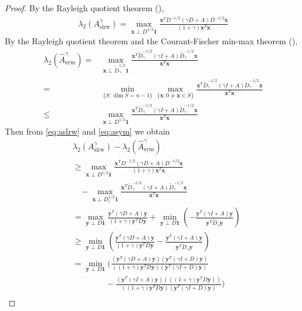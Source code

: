 \documentclass{article}
\newcommand{\x}{{\boldsymbol{x}}}
\newcommand{\0}{{\boldsymbol{0}}}
\newcommand{\6}{{\partial}}
\newcommand{\8}{{\infty}}
\newcommand{\4}{{\nabla}}
\begin{document}
\begin{proof}
By the Rayleigh quotient theorem (\citealp[Sec. 4.3]{HorJ13}),
\begin{align} \label{eq:aslrw}
\lambda_2(A_{\text{slrw}}^\gamma)
=   \max_{\bm{x}\perp D^{1/2}\bm{1}} \frac{\bm{x}^T D^{-1/2}(\gamma D + A) D^{-1/2} \bm{x}}{(1+\gamma) \bm{x}^T \bm{x}}  
\end{align}
By the Rayleigh quotient theorem and the Courant-Fischer min-max theorem (\citealp[Sec. 4.3]{HorJ13}), 
\begin{align}
 \lambda_2(\hat{A}_{\text{sym}}^\gamma)
= & \max_{\bm{x} \perp  \tilde{D}_\gamma^{1/2} \bm{1}} \frac{\bm{x}^T \tilde{D}_\gamma^{-1/2}(\gamma I + A) \tilde{D}_\gamma^{-1/2} \bm{x}}{\bm{x}^T \bm{x}} \nonumber \\ 
= & \min_{\{S: \dim{S}=n-1\}} \max_{\{\x:0\neq \x\in S\}} 
\frac{\bm{x}^T \tilde{D}_\gamma^{-1/2}(\gamma I + A) \tilde{D}_\gamma^{-1/2} \bm{x}}{\bm{x}^T \bm{x}} 
\nonumber\\
\leq & \max_{\bm{x}\perp D^{1/2}\bm{1}} 
\frac{\bm{x}^T \tilde{D}_\gamma^{-1/2}(\gamma I + A) \tilde{D}_\gamma^{-1/2} \bm{x}}{\bm{x}^T \bm{x}}
\label{eq:asym}
\end{align}
Then from \eqref{eq:aslrw} and \eqref{eq:asym} we obtain
\begin{align*}
&\lambda_2(A_{\text{slrw}}^\gamma) -  \lambda_2(\hat{A}_{\text{sym}}^\gamma)\\ 
& \geq \max_{\bm{x}\perp D^{1/2}\bm{1}} \frac{\bm{x}^T D^{-1/2}(\gamma D + A) D^{-1/2} \bm{x}}{(1+\gamma) \bm{x}^T \bm{x}} \\ 
& \ \ \ \ - \max_{\bm{x} \perp {D}_\gamma^{1/2} \bm{1}} \frac{\bm{x}^T \tilde{D}_\gamma^{-1/2}(\gamma I + A) \tilde{D}_\gamma^{-1/2} \bm{x}}{\bm{x}^T \bm{x}}  \\
& = \max_{\bm{y}\perp D \bm{1}} \frac{\bm{y}^T (\gamma D + A) \bm{y}}{(1+\gamma) \bm{y}^T D \bm{y}} + \min_{\bm{y} \perp D \bm{1}} \left(- \frac{\bm{y}^T (\gamma I + A) \bm{y}}{\bm{y}^T \tilde{D}_\gamma \bm{y}} \right)\\
& \geq  \min_{\bm{y} \perp D \bm{1}} \left(\frac{\bm{y}^T (\gamma D + A) \bm{y}}{(1+\gamma) \bm{y}^T D \bm{y}} - \frac{\bm{y}^T (\gamma I + A) \bm{y}}{\bm{y}^T \tilde{D}_\gamma \bm{y}} \right) \\
& = \min_{\bm{y} \perp D \bm{1}} \bigg(\frac{(\bm{y}^T (\gamma D + A) \bm{y}) (\bm{y}^T (\gamma I + D) \bm{y} )}{((1+\gamma) \bm{y}^T D \bm{y}) (\bm{y}^T (\gamma I + D) \bm{y})} \\
& \qquad\qquad - \frac{(\bm{y}^T (\gamma I + A) \bm{y}) (((1+\gamma) \bm{y}^T D \bm{y})) }{((1+\gamma) \bm{y}^T D \bm{y}) (\bm{y}^T (\gamma I + D) \bm{y})} \bigg)\\

\end{align*}
\end{proof}
\end{document}
